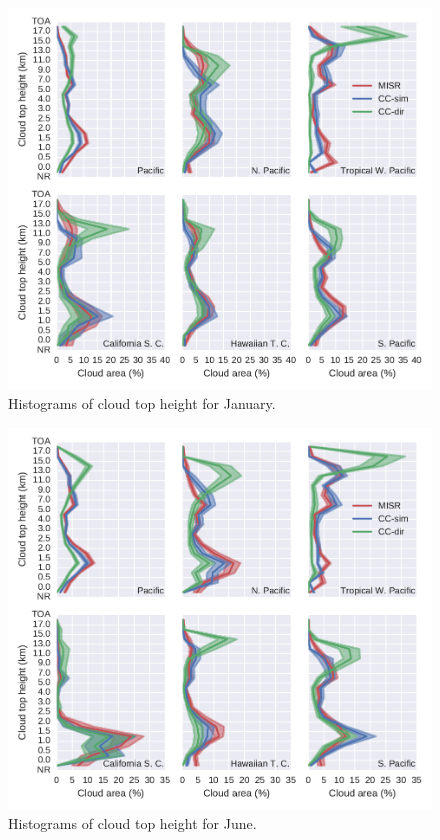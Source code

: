 \begin{figure}
\centering
\includegraphics[width=\columnwidth]{graphics/misr_cth_2008-01.pdf}
\caption{Histograms of cloud top height for January.}
\label{misr_cth_region_january}
\end{figure}

\begin{figure}
\centering
\includegraphics[width=\columnwidth]{graphics/misr_cth_2008-06.pdf}
\caption{Histograms of cloud top height for June.}
\label{misr_cth_region_june}
\end{figure}

